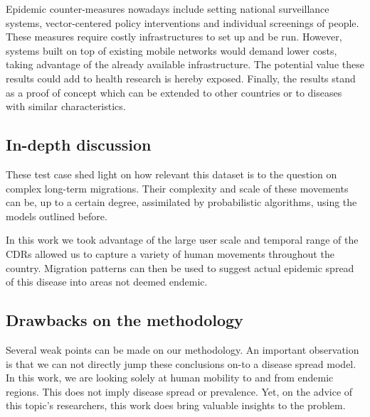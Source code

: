 


Epidemic counter-measures nowadays include setting national surveillance systems, vector-centered policy interventions and individual screenings of people. These measures require costly infrastructures to set up and be run. However, systems built on top of existing mobile networks would demand lower costs, taking advantage of the already available infrastructure. The potential value these results could add to health research is hereby exposed.
Finally, the results stand as a proof of concept which can be extended to other countries or to diseases with similar characteristics.



\subsection{In-depth discussion}







These test case shed light on how relevant this dataset is to the question on complex long-term migrations.
Their complexity and scale of these movements can be, up to a certain degree, assimilated by probabilistic algorithms, using the models outlined before.


In this work we took advantage of the large user scale and temporal range of the CDRs allowed us to capture a variety of human movements throughout the country.
Migration patterns can then be used to suggest actual epidemic spread of this disease into areas not deemed endemic.




\subsection{Drawbacks on the methodology}

Several weak points can be made on our methodology.
An important observation is that we can not directly jump these conclusions on-to a disease spread model.
In this work, we are looking solely at human mobility to and from endemic regions.
This does not imply disease spread or prevalence.
Yet, on the advice of this topic's researchers, this work does bring valuable insights to the problem.


